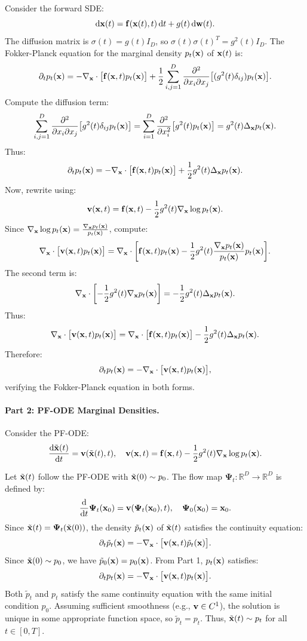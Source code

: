 Consider the forward SDE:
\[
\mathop{}\!\mathrm{d} {\mathbf{x}}(t) = {\mathbf{f}}({\mathbf{x}}(t), t)  \mathop{}\!\mathrm{d} t + g(t)  \mathop{}\!\mathrm{d} {\mathbf{w}}(t).
\]
The diffusion matrix is $\sigma(t) = g(t) I_D$, so $\sigma(t) \sigma(t)^T = g^2(t) I_D$. The Fokker-Planck equation for the marginal density $p_t({\mathbf{x}})$ of ${\mathbf{x}}(t)$ is:
\[
\partial_t p_t({\mathbf{x}}) = -\nabla_{{\mathbf{x}}} \cdot \bigl[ {\mathbf{f}}({\mathbf{x}}, t) p_t({\mathbf{x}}) \bigr] + \frac{1}{2} \sum_{i,j=1}^D \frac{\partial^2}{\partial x_i \partial x_j} \bigl[ (g^2(t) \delta_{ij}) p_t({\mathbf{x}}) \bigr].
\]
Compute the diffusion term:
\[
\sum_{i,j=1}^D \frac{\partial^2}{\partial x_i \partial x_j} \bigl[ g^2(t) \delta_{ij} p_t({\mathbf{x}}) \bigr] = \sum_{i=1}^D \frac{\partial^2}{\partial x_i^2} \bigl[ g^2(t) p_t({\mathbf{x}}) \bigr] = g^2(t) \Delta_{{\mathbf{x}}} p_t({\mathbf{x}}).
\]
Thus:
\[
\partial_t p_t({\mathbf{x}}) = -\nabla_{{\mathbf{x}}} \cdot \bigl[ {\mathbf{f}}({\mathbf{x}}, t) p_t({\mathbf{x}}) \bigr] + \frac{1}{2} g^2(t) \Delta_{{\mathbf{x}}} p_t({\mathbf{x}}).
\]
Now, rewrite using:
\[
{\mathbf{v}}({\mathbf{x}}, t) = {\mathbf{f}}({\mathbf{x}}, t) - \frac{1}{2} g^2(t) \nabla_{{\mathbf{x}}} \log p_t({\mathbf{x}}).
\]
Since $\nabla_{{\mathbf{x}}} \log p_t({\mathbf{x}}) = \frac{\nabla_{{\mathbf{x}}} p_t({\mathbf{x}})}{p_t({\mathbf{x}})}$, compute:
\[
\nabla_{{\mathbf{x}}} \cdot \bigl[ {\mathbf{v}}({\mathbf{x}}, t) p_t({\mathbf{x}}) \bigr] = \nabla_{{\mathbf{x}}} \cdot \biggl[ {\mathbf{f}}({\mathbf{x}}, t) p_t({\mathbf{x}}) - \frac{1}{2} g^2(t) \frac{\nabla_{{\mathbf{x}}} p_t({\mathbf{x}})}{p_t({\mathbf{x}})} p_t({\mathbf{x}}) \biggr].
\]
The second term is:
\[
\nabla_{{\mathbf{x}}} \cdot \biggl[ -\frac{1}{2} g^2(t) \nabla_{{\mathbf{x}}} p_t({\mathbf{x}}) \biggr] = -\frac{1}{2} g^2(t) \Delta_{{\mathbf{x}}} p_t({\mathbf{x}}).
\]
Thus:
\[
\nabla_{{\mathbf{x}}} \cdot \bigl[ {\mathbf{v}}({\mathbf{x}}, t) p_t({\mathbf{x}}) \bigr] = \nabla_{{\mathbf{x}}} \cdot \bigl[ {\mathbf{f}}({\mathbf{x}}, t) p_t({\mathbf{x}}) \bigr] - \frac{1}{2} g^2(t) \Delta_{{\mathbf{x}}} p_t({\mathbf{x}}).
\]
Therefore:
\[
\partial_t p_t({\mathbf{x}}) = -\nabla_{{\mathbf{x}}} \cdot \bigl[ {\mathbf{v}}({\mathbf{x}}, t) p_t({\mathbf{x}}) \bigr],
\]
verifying the Fokker-Planck equation in both forms.

\paragraph{Part 2: PF-ODE Marginal Densities.}

Consider the PF-ODE:
\[
\frac{\mathop{}\!\mathrm{d} \tilde{{\mathbf{x}}}(t)}{\mathop{}\!\mathrm{d} t} = {\mathbf{v}}(\tilde{{\mathbf{x}}}(t), t), \quad {\mathbf{v}}({\mathbf{x}}, t) = {\mathbf{f}}({\mathbf{x}}, t) - \frac{1}{2} g^2(t) \nabla_{{\mathbf{x}}} \log p_t({\mathbf{x}}).
\]

 Let $\tilde{{\mathbf{x}}}(t)$ follow the PF-ODE with $\tilde{{\mathbf{x}}}(0) \sim p_0$. The flow map $\bm{\Psi}_t: \mathbb{R}^D \to \mathbb{R}^D$ is defined by:
\[
\frac{\mathop{}\!\mathrm{d}}{\mathop{}\!\mathrm{d} t} \bm{\Psi}_t(\mathbf{x}_0) = {\mathbf{v}}(\bm{\Psi}_t(\mathbf{x}_0), t), \quad \bm{\Psi}_0(\mathbf{x}_0) = \mathbf{x}_0.
\]
Since $\tilde{{\mathbf{x}}}(t) = \bm{\Psi}_t(\tilde{{\mathbf{x}}}(0))$, the density $\tilde p_t({\mathbf{x}})$ of $\tilde{{\mathbf{x}}}(t)$ satisfies the continuity equation:
\[
\partial_t \tilde p_t({\mathbf{x}}) = -\nabla_{{\mathbf{x}}} \cdot \bigl[ {\mathbf{v}}({\mathbf{x}}, t) \tilde p_t({\mathbf{x}}) \bigr].
\]
Since $\tilde{{\mathbf{x}}}(0) \sim p_0$, we have $\tilde p_0({\mathbf{x}}) = p_0({\mathbf{x}})$. From Part 1, $p_t({\mathbf{x}})$ satisfies:
\[
\partial_t p_t({\mathbf{x}}) = -\nabla_{{\mathbf{x}}} \cdot \bigl[ {\mathbf{v}}({\mathbf{x}}, t) p_t({\mathbf{x}}) \bigr].
\]
Both $\tilde p_t$ and $p_t$ satisfy the same continuity equation with the same initial condition $p_0$. Assuming sufficient smoothness (e.g., ${\mathbf{v}} \in C^1$), the solution is unique in some appropriate function space, so $\tilde p_t = p_t$. Thus, $\tilde{{\mathbf{x}}}(t) \sim p_t$ for all $t \in [0, T]$.


